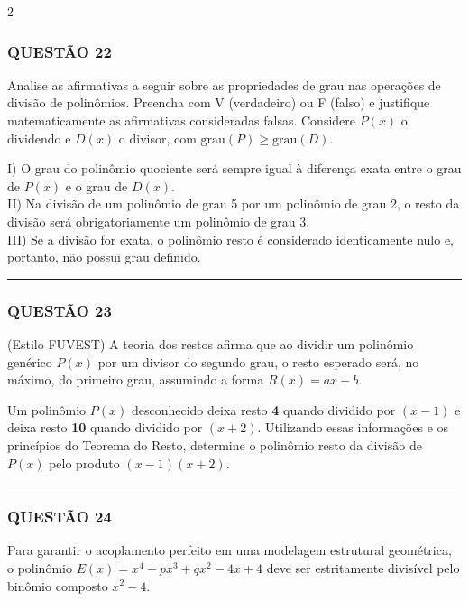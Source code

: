 \documentclass[11pt, a4paper]{article}
\begin{document}
\begin{multicols*}{2}
\subsubsection*{QUESTÃO 22}

Analise as afirmativas a seguir sobre as propriedades de grau nas operações de divisão de polinômios. Preencha com V (verdadeiro) ou F (falso) e justifique matematicamente as afirmativas consideradas falsas. Considere $ P(x) $ o dividendo e $ D(x) $ o divisor, com $ \text{grau}(P) \geq \text{grau}(D) $.

I) O grau do polinômio quociente será sempre igual à diferença exata entre o grau de $ P(x) $ e o grau de $ D(x) $.\\[0.3cm]
II) Na divisão de um polinômio de grau 5 por um polinômio de grau 2, o resto da divisão será obrigatoriamente um polinômio de grau 3.\\[0.3cm]
III) Se a divisão for exata, o polinômio resto é considerado identicamente nulo e, portanto, não possui grau definido.

\vspace{0cm} \noindent\textcolor{CorLinha}{\rule{\linewidth}{0.5pt}} \vspace{-0.2cm}
\subsubsection*{QUESTÃO 23}

(Estilo FUVEST) A teoria dos restos afirma que ao dividir um polinômio genérico $ P(x) $ por um divisor do segundo grau, o resto esperado será, no máximo, do primeiro grau, assumindo a forma $ R(x) = ax + b $. 

Um polinômio $ P(x) $ desconhecido deixa resto \textbf{4} quando dividido por $ (x - 1) $ e deixa resto \textbf{10} quando dividido por $ (x + 2) $. Utilizando essas informações e os princípios do Teorema do Resto, determine o polinômio resto da divisão de $ P(x) $ pelo produto $ (x - 1)(x + 2) $.

\vspace{0cm} \noindent\textcolor{CorLinha}{\rule{\linewidth}{0.5pt}} \vspace{-0.2cm}
\subsubsection*{QUESTÃO 24}

Para garantir o acoplamento perfeito em uma modelagem estrutural geométrica, o polinômio $ E(x) = x^4 - px^3 + qx^2 - 4x + 4 $ deve ser estritamente divisível pelo binômio composto $ x^2 - 4 $. 


\end{multicols*}
\end{document}
